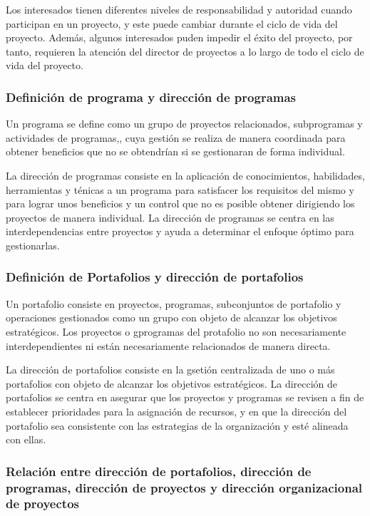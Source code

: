 Los interesados tienen diferentes niveles de responsabilidad y autoridad cuando participan en un proyecto, y este puede cambiar durante el ciclo de vida del proyecto. Además, algunos interesados puden impedir el éxito del proyecto, por tanto, requieren la atención del director de proyectos a lo largo de todo el ciclo de vida del proyecto.

\subsubsection{Definición de programa y dirección de programas}

Un programa se define como un grupo de proyectos relacionados, subprogramas y actividades de programas,, cuya gestión se realiza de manera coordinada para obtener beneficios que no se obtendrían si se gestionaran de forma individual.

La dirección de programas consiste en la aplicación de conocimientos, habilidades, herramientas y ténicas a un programa para satisfacer los requisitos del mismo y para lograr unos beneficios y un control que no es posible obtener dirigiendo los proyectos de manera individual. La dirección de programas se centra en las interdependencias entre proyectos y ayuda a determinar el enfoque óptimo para gestionarlas.

\subsubsection{Definición de Portafolios y dirección de portafolios}

Un portafolio consiste en proyectos, programas, subconjuntos de portafolio y operaciones gestionados como un grupo con objeto de alcanzar los objetivos estratégicos. Los proyectos o gprogramas del protafolio no son necesariamente interdependientes ni están necesariamente relacionados de manera directa.

La dirección de portafolios consiste en la gsetión centralizada de uno o más portafolios con objeto de alcanzar los objetivos estratégicos. La dirección de portafolios se centra en asegurar que los proyectos y programas se revisen a fin de establecer prioridades para la asignación de recursos, y en que la dirección del portafolio sea consistente con las estrategias de la organización y esté alineada con ellas.

\subsubsection{Relación entre dirección de portafolios, dirección de programas, dirección de proyectos y dirección organizacional de proyectos}

